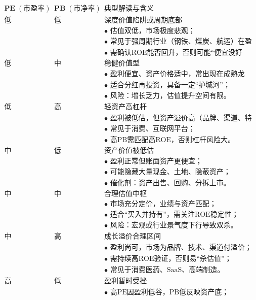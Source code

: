 \[
\begin{array}{|c|c|l|}
\hline
\textbf{PE}\;(\text{市盈率}) & \textbf{PB}\;(\text{市净率}) & \textbf{典型解读与含义} \\
\hline
\text{低} & \text{低} & \textbf{深度价值陷阱或周期底部} \\ 
& & \text{• 估值双低，市场极度悲观；} \\
& & \text{• 常见于强周期行业（钢铁、煤炭、航运）在盈利谷底；} \\
& & \text{• 需确认ROE能否回升，否则可能“便宜没好货”。} \\
\hline
\text{低} & \text{中} & \textbf{稳健价值型} \\ 
& & \text{• 盈利便宜、资产价格适中，常出现在成熟龙头；} \\
& & \text{• 适合分红再投资，具备一定“护城河”；} \\
& & \text{• 风险：增长乏力，估值提升空间有限。} \\
\hline
\text{低} & \text{高} & \textbf{轻资产高杠杆} \\ 
& & \text{• 盈利被低估，但资产溢价高（品牌、渠道、特许权）；} \\
& & \text{• 常见于消费、互联网平台；} \\
& & \text{• 高PB需匹配高ROE，否则杠杆风险大。} \\
\hline
\text{中} & \text{低} & \textbf{资产价值被低估} \\ 
& & \text{• 盈利正常但账面资产更便宜；} \\
& & \text{• 可能隐藏大量现金、土地、隐蔽资产；} \\
& & \text{• 催化剂：资产出售、回购、分拆上市。} \\
\hline
\text{中} & \text{中} & \textbf{合理估值中枢} \\ 
& & \text{• 市场充分定价，业绩与资产匹配；} \\
& & \text{• 适合“买入并持有”，需关注ROE稳定性；} \\
& & \text{• 风险：宏观或行业景气度下行导致双杀。} \\
\hline
\text{中} & \text{高} & \textbf{成长溢价合理区间} \\ 
& & \text{• 盈利尚可，市场为品牌、技术、渠道付溢价；} \\
& & \text{• 需持续高ROE验证，否则易“杀估值”；} \\
& & \text{• 常见于消费医药、SaaS、高端制造。} \\
\hline
\text{高} & \text{低} & \textbf{盈利暂时受挫} \\ 
& & \text{• 高PE因盈利低谷，PB低反映资产底；} \\

\end{array}\]
